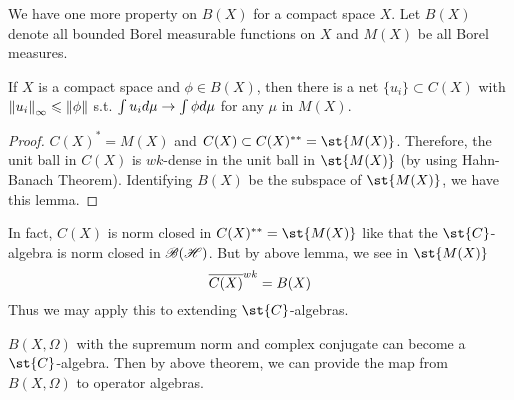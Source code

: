 We have one more property on $B(X)$ for a compact space $X$. Let $B(X)$ denote all bounded Borel measurable functions on $X$ and $M(X)$ be all Borel measures.

\begin{lem}
	If $X$ is a compact space and $\phi \in B(X)$, then there is a net $\{u_i\} \subset C(X)$ with $\left\lVert u_i\right\lVert_{\infty} \leqslant \left\lVert\phi\right\lVert$ s.t. $\int u_i d\mu \rightarrow \int \phi d\mu$ for any $\mu$ in $M(X)$.
\end{lem}
\begin{proof}
	$C(X)^{*} = M(X)$ and $C(X) \subset C(X)^{**} = \st{M(X)}$.  Therefore, the unit ball in $C(X)$ is $wk$-dense in the unit ball in $\st{M(X)}$ (by using Hahn-Banach Theorem). Identifying $B(X)$ be the subspace of $\st{M(X)}$, we have this lemma.
\end{proof}
\begin{rem}
	In fact, $C(X)$ is norm closed in $C(X)^{**} = \st{M(X)}$ like that the $\st{C}$-algebra is norm closed in $\mathscr{B(H)}$. But by above lemma, we see in $\st{M(X)}$
	\begin{equation*}
		\overline{C(X)}^{wk} = B(X)
	\end{equation*}
	Thus we may apply this to extending $\st{C}$-algebras.
\end{rem}


$B(X,\Omega)$ with the supremum norm and complex conjugate can become a $\st{C}$-algebra. Then by above theorem, we can provide the map from $B(X,\Omega)$ to operator algebras.

